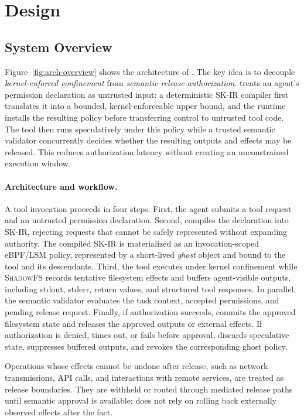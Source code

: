 \section{Design}

\subsection{System Overview}
\label{sec:design:overview}

Figure~\ref{fig:arch-overview} shows the architecture of \SystemName. The key
idea is to decouple \emph{kernel-enforced confinement} from \emph{semantic
release authorization}. \SystemName treats an agent's permission declaration as
untrusted input: a deterministic SK-IR compiler first translates it into a
bounded, kernel-enforceable upper bound, and the runtime installs the resulting
policy before transferring control to untrusted tool code. The tool then runs
speculatively under this policy while a trusted semantic validator concurrently
decides whether the resulting outputs and effects may be released. This reduces
authorization latency without creating an unconstrained execution window.

\paragraph{Architecture and workflow.}
A tool invocation proceeds in four steps. First, the agent submits a tool
request and an untrusted permission declaration. Second, \SystemName compiles
the declaration into SK-IR, rejecting requests that cannot be safely represented
without expanding authority. The compiled SK-IR is materialized as an
invocation-scoped eBPF/LSM policy, represented by a short-lived \emph{ghost}
object and bound to the tool and its descendants. Third, the tool executes under
kernel confinement while \textsc{ShadowFS} records tentative filesystem effects
and buffers agent-visible outputs, including stdout, stderr, return values, and
structured tool responses. In parallel, the semantic validator evaluates the
task context, accepted permissions, and pending release request. Finally, if
authorization succeeds, \SystemName commits the approved filesystem state and
releases the approved outputs or external effects. If authorization is denied,
times out, or fails before approval, \SystemName discards speculative state,
suppresses buffered outputs, and revokes the corresponding ghost policy.

Operations whose effects cannot be undone after release, such as network
transmissions, API calls, and interactions with remote services, are treated as
release boundaries. They are withheld or routed through mediated release paths
until semantic approval is available; \SystemName does not rely on rolling back
externally observed effects after the fact.

